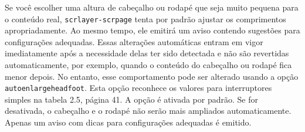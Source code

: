 Se você escolher uma altura de cabeçalho ou rodapé que seja muito pequena para o conteúdo real, \texttt{scrlayer-scrpage} tenta por padrão ajustar os comprimentos apropriadamente. Ao mesmo tempo, ele emitirá um aviso contendo sugestões para configurações adequadas. Essas alterações automáticas entram em vigor imediatamente após a necessidade delas ter sido detectada e não são revertidas automaticamente, por exemplo, quando o conteúdo do cabeçalho ou rodapé fica menor depois. No entanto, esse comportamento pode ser alterado usando a opção \texttt{auto\-en\-lar\-ge\-head\-foot}. Esta opção reconhece os valores para interruptores simples na tabela 2.5, página 41. A opção é ativada por padrão. Se for desativada, o cabeçalho e o rodapé não serão mais ampliados automaticamente. Apenas um aviso com dicas para configurações adequadas é emitido.


